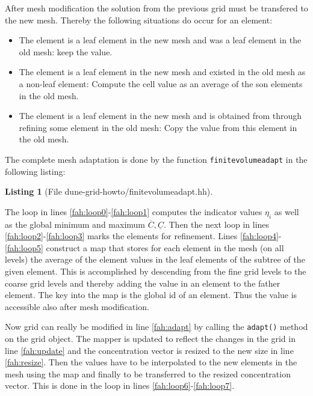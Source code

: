 \documentclass[11pt,a4paper,headinclude,footinclude,DIV16,normalheadings]{scrreprt}
\newtheorem{lst}{Listing}
\begin{document}
After mesh modification the solution from the previous grid must be
transfered to the new mesh. Thereby the following situations do occur
for an element:
\begin{itemize}
\item The element is a leaf element in the new mesh and was a leaf
  element in the old mesh: keep the value.
\item The element is a leaf element in the new mesh and existed in the
  old mesh as a non-leaf element: Compute the cell value as an average
  of the son elements in the old mesh.
\item The element is a leaf element in the new mesh and is obtained
  from through refining some element in the old mesh: Copy the value
  from this element in the old mesh.
\end{itemize}

The complete mesh adaptation is done by the function
\lstinline!finitevolumeadapt! in the following listing:

\begin{lst}[File dune-grid-howto/finitevolumeadapt.hh] \mbox{}
\nopagebreak

\end{lst}

The loop in lines \ref{fah:loop0}-\ref{fah:loop1} computes the
indicator values $\eta_i$ as well as the global minimum and maximum
$\overline{C},\underline{C}$. Then the next loop in lines
\ref{fah:loop2}-\ref{fah:loop3} marks the elements for refinement.
Lines \ref{fah:loop4}-\ref{fah:loop5} construct a map that stores for
each element in the mesh (on all levels) the average of the element
values in the leaf elements of the subtree of the given element. This
is accomplished by descending from the fine grid levels to the coarse
grid levels and thereby adding the value in an element to the father
element. The key into the map is the global id of an element. Thus the
value is accessible also after mesh modification.

Now grid can really be modified in line \ref{fah:adapt} by calling the
\lstinline!adapt()! method on the grid object. The mapper is updated
to reflect the changes in the grid in line \ref{fah:update} and the
concentration vector is resized to the new size in line
\ref{fah:resize}. Then the values have to be interpolated to the new
elements in the mesh using the map and finally to be transferred to
the resized concentration vector. This is done in the loop in lines
\ref{fah:loop6}-\ref{fah:loop7}.
\end{document}
